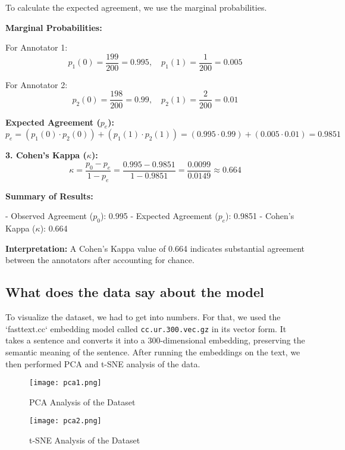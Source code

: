 \documentclass[sigconf]{acmart}
\begin{document}
To calculate the expected agreement, we use the marginal probabilities.

\textbf{Marginal Probabilities:}

For Annotator 1:
\[
p_1(0) = \frac{199}{200} = 0.995, \quad p_1(1) = \frac{1}{200} = 0.005
\]

For Annotator 2:
\[
p_2(0) = \frac{198}{200} = 0.99, \quad p_2(1) = \frac{2}{200} = 0.01
\]

\textbf{Expected Agreement ($p_e$):}
\[
p_e = (p_1(0) \cdot p_2(0)) + (p_1(1) \cdot p_2(1)) = (0.995 \cdot 0.99) + (0.005 \cdot 0.01) = 0.9851
\]

\textbf{3. Cohen’s Kappa ($\kappa$):}
\[
\kappa = \frac{p_0 - p_e}{1 - p_e} = \frac{0.995 - 0.9851}{1 - 0.9851} = \frac{0.0099}{0.0149} \approx 0.664
\]

\textbf{Summary of Results:}

- Observed Agreement ($p_0$): 0.995
- Expected Agreement ($p_e$): 0.9851
- Cohen’s Kappa ($\kappa$): 0.664

\textbf{Interpretation:}  
A Cohen’s Kappa value of 0.664 indicates substantial agreement between the annotators after accounting for chance.

\subsection{What does the data say about the model}

To visualize the dataset, we had to get into numbers. For that, we used the `fasttext.cc` embedding model called \texttt{cc.ur.300.vec.gz} in its vector form. It takes a sentence and converts it into a 300-dimensional embedding, preserving the semantic meaning of the sentence. After running the embeddings on the text, we then performed PCA and t-SNE analysis of the data.

\begin{figure}[h]
    \centering
    \texttt{[image: pca1.png]}
    \caption{PCA Analysis of the Dataset}
    \label{fig:pca_analysis}
\end{figure}

\begin{figure}[h]
    \centering
    \texttt{[image: pca2.png]}
    \caption{t-SNE Analysis of the Dataset}
    \label{fig:tsne_analysis}
\end{figure}
\end{document}
